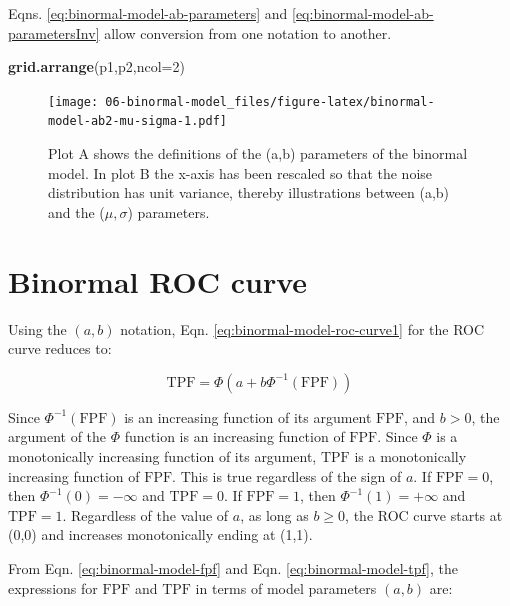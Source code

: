 \documentclass[
]{book}
\newenvironment{Shaded}{\begin{snugshade}}{\end{snugshade}}
\newcommand{\DataTypeTok}[1]{\textcolor[rgb]{0.13,0.29,0.53}{#1}}
\newcommand{\DecValTok}[1]{\textcolor[rgb]{0.00,0.00,0.81}{#1}}
\newcommand{\KeywordTok}[1]{\textcolor[rgb]{0.13,0.29,0.53}{\textbf{#1}}}
\newcommand{\NormalTok}[1]{#1}
\begin{document}
Eqns. \eqref{eq:binormal-model-ab-parameters} and \eqref{eq:binormal-model-ab-parametersInv} allow conversion from one notation to another.

\begin{Shaded}
\begin{Highlighting}[]
\KeywordTok{grid.arrange}\NormalTok{(p1,p2,}\DataTypeTok{ncol=}\DecValTok{2}\NormalTok{)}
\end{Highlighting}
\end{Shaded}

\begin{figure}
\centering
\texttt{[image: 06-binormal-model\_files/figure-latex/binormal-model-ab2-mu-sigma-1.pdf]}
\caption{\label{fig:binormal-model-ab2-mu-sigma}Plot A shows the definitions of the (a,b) parameters of the binormal model. In plot B the x-axis has been rescaled so that the noise distribution has unit variance, thereby illustrations between (a,b) and the (\(\mu,\sigma\)) parameters.}
\end{figure}

\hypertarget{binormal-model-roc-curve}{%
\section{Binormal ROC curve}\label{binormal-model-roc-curve}}

Using the \((a,b)\) notation, Eqn. \eqref{eq:binormal-model-roc-curve1} for the ROC curve reduces to:

\begin{equation} 
\text{TPF} = \Phi\left ( a+ b \Phi^{-1}\left (\text{FPF}  \right ) \right )
\label{eq:binormal-model-roc-curve}
\end{equation}

Since \(\Phi^{-1}(\text{FPF})\) is an increasing function of its argument \(\text{FPF}\), and \(b > 0\), the argument of the \(\Phi\) function is an increasing function of \(\text{FPF}\). Since \(\Phi\) is a monotonically increasing function of its argument, \(\text{TPF}\) is a monotonically increasing function of \(\text{FPF}\). This is true regardless of the sign of \(a\). If \(\text{FPF} = 0\), then \(\Phi^{-1}(0) = -\infty\) and \(\text{TPF} = 0\). If \(\text{FPF} = 1\), then \(\Phi^{-1}(1) = +\infty\) and \(\text{TPF} = 1\). Regardless of the value of \(a\), as long as \(b \ge 0\), the ROC curve starts at (0,0) and increases monotonically ending at (1,1).

From Eqn. \eqref{eq:binormal-model-fpf} and Eqn. \eqref{eq:binormal-model-tpf}, the expressions for \(\text{FPF}\) and \(\text{TPF}\) in terms of model parameters \((a,b)\) are:
\end{document}
